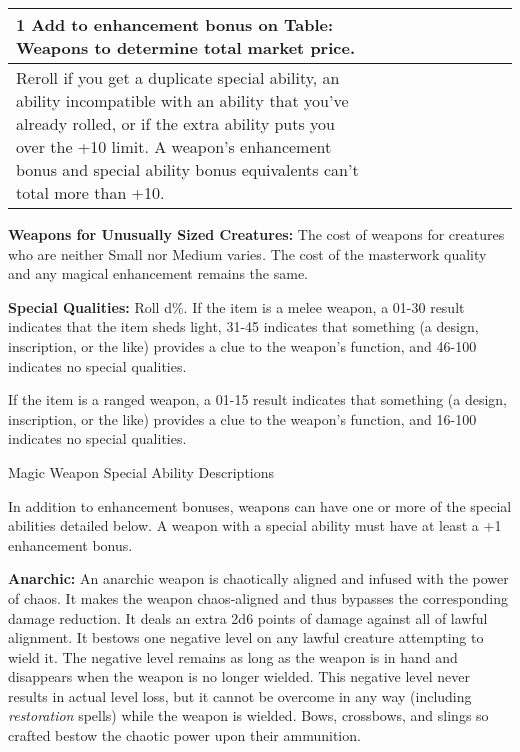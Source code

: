 \begin{longtable}{llllllllll}
{\begin{minipage}[t]{1.739in}
1 Add to enhancement bonus on Table: Weapons to determine total market price.\end{minipage}}\\
\hline
\multicolumn{1}{|p{0.498in}|}{\begin{minipage}[t]{0.498in}\raggedleft
2 Reroll if you get a duplicate special ability, an ability incompatible with an 
ability that you've already rolled, or if the extra ability puts you over the +10 
limit. A weapon's enhancement bonus and special ability bonus equivalents can't 
total more than +10.\end{minipage}}\\
\hline
\end{longtable}

\vspace{12pt}
\textbf{Weapons for Unusually Sized Creatures:} The cost of weapons for creatures 
who are neither Small nor Medium varies\textit{. }The cost of the masterwork quality 
and any magical enhancement remains the same.

\textbf{Special Qualities:} Roll d\%. If the item is a melee weapon, a 01-30 result 
indicates that the item sheds light, 31-45 indicates that something (a design, 
inscription, or the like) provides a clue to the weapon's function, and 46-100 
indicates no special qualities. 

If the item is a ranged weapon, a 01-15 result indicates that something (a design, 
inscription, or the like) provides a clue to the weapon's function, and 16-100 
indicates no special qualities.

\vspace{12pt}
Magic Weapon Special Ability Descriptions

In addition to enhancement bonuses, weapons can have one or more of the special 
abilities detailed below. A weapon with a special ability must have at least a 
+1 enhancement bonus.

\textbf{Anarchic:} An anarchic weapon is chaotically aligned and infused with the 
power of chaos. It makes the weapon chaos-aligned and thus bypasses the corresponding 
damage reduction. It deals an extra 2d6 points of damage against all of lawful 
alignment. It bestows one negative level on any lawful creature attempting to wield 
it. The negative level remains as long as the weapon is in hand and disappears 
when the weapon is no longer wielded. This negative level never results in actual 
level loss, but it cannot be overcome in any way (including \textit{restoration 
}spells) while the weapon is wielded. Bows, crossbows, and slings so crafted bestow 
the chaotic power upon their ammunition.

